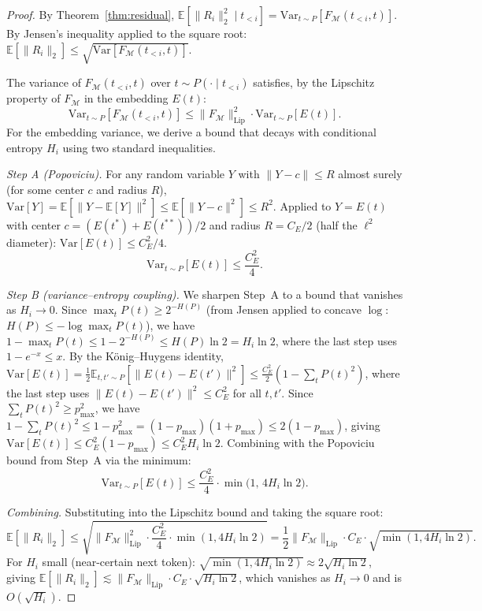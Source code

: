 \documentclass[11pt]{article}
\begin{document}
\begin{proof}
By Theorem~\ref{thm:residual}, $\mathbb{E}[\|R_i\|_2^2 \mid t_{<i}]
= \mathrm{Var}_{t \sim P}[F_{\mathcal{M}}(t_{<i}, t)]$.
By Jensen's inequality applied to the square root:
$\mathbb{E}[\|R_i\|_2] \leq \sqrt{\mathrm{Var}[F_{\mathcal{M}}(t_{<i}, t)]}$.

The variance of $F_{\mathcal{M}}(t_{<i}, t)$ over $t \sim P(\cdot \mid t_{<i})$
satisfies, by the Lipschitz property of $F_{\mathcal{M}}$ in the embedding $E(t)$:
\[
  \mathrm{Var}_{t \sim P}[F_{\mathcal{M}}(t_{<i},t)]
  \leq \|F_{\mathcal{M}}\|_{\mathrm{Lip}}^2 \cdot \mathrm{Var}_{t \sim P}[E(t)].
\]
For the embedding variance, we derive a bound that decays with conditional entropy $H_i$
using two standard inequalities.

\textit{Step A (Popoviciu).}  For any random variable $Y$ with $\|Y - c\| \leq R$
almost surely (for some center $c$ and radius $R$),
$\mathrm{Var}[Y] = \mathbb{E}[\|Y - \mathbb{E}[Y]\|^2] \leq \mathbb{E}[\|Y - c\|^2] \leq R^2$.
Applied to $Y = E(t)$ with center $c = (E(t^*) + E(t^{**}))/2$ and radius
$R = C_E/2$ (half the $\ell^2$ diameter): $\mathrm{Var}[E(t)] \leq C_E^2/4$.
\[
  \mathrm{Var}_{t \sim P}[E(t)] \leq \frac{C_E^2}{4}.
\]

\textit{Step B (variance--entropy coupling).}  We sharpen Step~A to a
bound that vanishes as $H_i \to 0$.  Since $\max_t P(t) \geq 2^{-H(P)}$
(from Jensen applied to concave $\log$: $H(P) \leq -\log \max_t P(t)$), we have
$1 - \max_t P(t) \leq 1 - 2^{-H(P)} \leq H(P)\ln 2 = H_i \ln 2$,
where the last step uses $1 - e^{-x} \leq x$.
By the König--Huygens identity,
$\mathrm{Var}[E(t)] = \tfrac{1}{2}\mathbb{E}_{t,t'\sim P}[\|E(t)-E(t')\|^2]
\leq \tfrac{C_E^2}{2}(1 - \sum_t P(t)^2)$,
where the last step uses $\|E(t)-E(t')\|^2 \leq C_E^2$ for all $t,t'$.
Since $\sum_t P(t)^2 \geq p_{\max}^2$, we have
$1 - \sum_t P(t)^2 \leq 1 - p_{\max}^2 = (1-p_{\max})(1+p_{\max}) \leq 2(1-p_{\max})$,
giving $\mathrm{Var}[E(t)] \leq C_E^2(1-p_{\max}) \leq C_E^2 H_i \ln 2$.
Combining with the Popoviciu bound from Step~A via the minimum:
\[
  \mathrm{Var}_{t \sim P}[E(t)] \leq \frac{C_E^2}{4} \cdot \min\!\bigl(1,\, 4 H_i \ln 2\bigr).
\]

\textit{Combining.}  Substituting into the Lipschitz bound and taking the square root:
\[
  \mathbb{E}[\|R_i\|_2]
  \leq \sqrt{\|F_{\mathcal{M}}\|_{\mathrm{Lip}}^2 \cdot \frac{C_E^2}{4} \cdot \min(1, 4 H_i \ln 2)}
  = \frac{1}{2}\|F_{\mathcal{M}}\|_{\mathrm{Lip}} \cdot C_E \cdot \sqrt{\min(1, 4 H_i \ln 2)}.
\]
For $H_i$ small (near-certain next token): $\sqrt{\min(1, 4 H_i \ln 2)} \approx 2\sqrt{H_i \ln 2}$,
giving $\mathbb{E}[\|R_i\|_2] \lesssim \|F_{\mathcal{M}}\|_{\mathrm{Lip}} \cdot C_E \cdot \sqrt{H_i \ln 2}$,
which vanishes as $H_i \to 0$ and is $O(\sqrt{H_i})$.
\end{proof}
\end{document}
